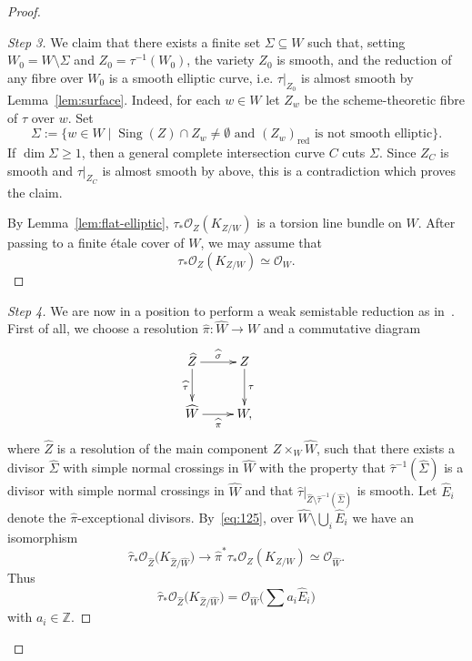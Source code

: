 \documentclass[11pt]{article}
\theoremstyle{definition}
\newenvironment{proofc}{\begin{proof}}{\end{proof}}
\numberwithin{equation}{section}
\numberwithin{figure}{section}
\numberwithin{table}{section}
\DeclareMathOperator{\Sing}{Sing}
\DeclareMathOperator{\red}{red}
\newcommand{\Z}{\mathbb{Z}}
\newcommand{\OO}{\mathcal{O}}
\newenvironment{step}[1]{\begin{proof}[#1]}{\let\qed\relax\end{proof}}
\begin{document}
\begin{proofc}
\begin{step}{Step 3}
We claim that there exists a finite set $\Sigma \subseteq W$ such that, setting $W_0 = W \setminus \Sigma$ and $Z_0 = \tau^{-1}(W_0)$, the variety $Z_0$ is smooth, and the reduction of any fibre over $W_0$ is a smooth elliptic curve, i.e. $\tau|_{Z_0}$ is almost smooth by Lemma~\ref{lem:surface}. Indeed, for each $w\in W$ let $Z_w$ be the scheme-theoretic fibre of $\tau$ over $w$. Set
\[
\Sigma:=\{w\in W\mid \Sing(Z)\cap Z_w\neq\emptyset\text{ and }(Z_w)_{\red} \text{ is not smooth elliptic}\}.
\]
If $\dim \Sigma\geq1$, then a general complete intersection curve $C$ cuts $\Sigma$. Since $Z_C$ is smooth and $\tau|_{Z_C}$ is almost smooth by above, this is a contradiction which proves the claim.

By Lemma~\ref{lem:flat-elliptic}, $\tau_*\OO_{Z}(K_{Z/W})$ is a torsion line bundle on $W$. After passing to a finite étale cover of $W$, we may assume that
\begin{equation}\label{eq:125}
\tau_*\OO_{Z}(K_{Z/W}) \simeq \OO_{W}.
\end{equation}
\end{step}

\begin{step}{Step 4}
We are now in a position to perform a weak semistable reduction as in~\cite[Definition~6.7 and Lemma~6.8]{Vi95}. First of all, we choose a resolution $\widehat \pi \colon \widehat W \to W $ and a commutative diagram
\[
\xymatrix{
\widehat Z \ar[d]_-{\widehat \tau} \ar[r]^{\widehat \sigma} & {Z} \ar[d]^-{\tau} \\
\widehat W \ar[r]_{\widehat \pi} & W, & }
\]
where $\widehat Z$ is a resolution of the main component $Z \times_{W} \widehat W$, such that there exists a divisor $\widehat \Sigma$ with simple normal crossings in $\widehat W$ with the property that $\widehat \tau^{-1}(\widehat \Sigma)$ is a divisor with simple normal crossings in $\widehat W$ and that $\widehat \tau|_{\widehat{Z}\setminus\widehat\tau^{-1}(\widehat{\Sigma})}$ is smooth. Let $\widehat E_i$ denote the $\widehat \pi$-exceptional divisors. By~\eqref{eq:125}, over $\widehat W \setminus \bigcup_i \widehat E_i$ we have an isomorphism
\[
\widehat \tau_*\OO_{\widehat Z}\big(K_{\widehat Z / \widehat W}\big) \to \widehat \pi^* \tau_* \OO_Z(K_{Z/W}) \simeq \OO_{\widehat W}.
\]
Thus
\begin{equation}\label{eq:int}
\widehat \tau_*\OO_{\widehat Z}\big(K_{\widehat Z/ \widehat W}\big) = \OO_{\widehat W}\big(\sum a_i \widehat E_i\big)
\end{equation}
with $a_i \in \Z$.


\end{step}
\end{proofc}
\end{document}
